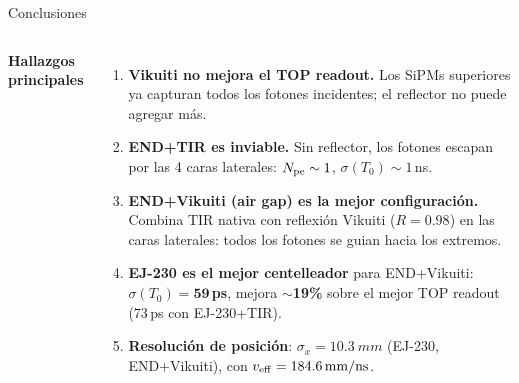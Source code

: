 \documentclass[aspectratio=169,9pt]{beamer}
\begin{document}
\begin{frame}{Conclusiones}
  \begin{columns}[T]
    \textbf{Hallazgos principales}
    \begin{enumerate}
      \item \textbf{Vikuiti no mejora el TOP readout.}
            Los SiPMs superiores ya capturan todos los fotones incidentes;
            el reflector no puede agregar m\'as.

      \item \textbf{END+TIR es inviable.}
            Sin reflector, los fotones escapan por las 4 caras laterales:
            $N_{\rm pe}\sim 1$, $\sigma(T_0)\sim 1$\,ns.

      \item \textbf{END+Vikuiti (air gap) es la mejor configuraci\'on.}
            Combina TIR nativa con reflexi\'on Vikuiti ($R=0.98$) en las caras laterales:
            todos los fotones se guian hacia los extremos.

      \item \textbf{EJ-230 es el mejor centelleador} para END+Vikuiti:
            $\sigma(T_0) = \mathbf{59}$\,\textbf{ps}, mejora $\sim$\textbf{19\%}
            sobre el mejor TOP readout (73\,ps con EJ-230+TIR).

      \item \textbf{Resoluci\'on de posici\'on}: $\sigma_x = \SI{10.3}{mm}$
            (EJ-230, END+Vikuiti), con $v_{\rm eff} = \SI{184.6}{mm/ns}$.
    \end{enumerate}


\end{columns}
\end{frame}
\end{document}
